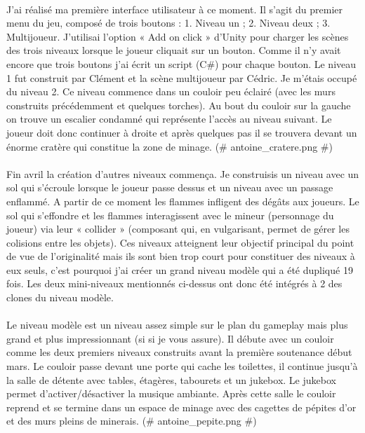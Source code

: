 \documentclass[titlepage, 13px, a4paper]{report}
\begin{document}
\paragraph{} \hspace{0pt} 
J'ai réalisé ma première interface utilisateur à ce moment. Il s'agit du premier menu
du jeu, composé de trois boutons : 1. Niveau un ; 2. Niveau deux ; 3. Multijoueur.
J'utilisai l'option « Add on click » d'Unity pour charger les scènes des trois niveaux
lorsque le joueur cliquait sur un bouton. Comme il n'y avait encore que trois
boutons j'ai écrit un script (C\#) pour chaque bouton. Le niveau 1 fut construit par
Clément et la scène multijoueur par Cédric. Je m'étais occupé du niveau 2. Ce
niveau commence dans un couloir peu éclairé (avec les murs construits
précédemment et quelques torches). Au bout du couloir sur la gauche on trouve un
escalier condamné qui représente l'accès au niveau suivant. Le joueur doit donc
continuer à droite et après quelques pas il se trouvera devant un énorme cratère
qui constitue la zone de minage. \@(\# antoine\_cratere.png \#)\@   \\


\paragraph{} \hspace{0pt} 
Fin avril la création d'autres niveaux commença. Je construisis un niveau avec un
sol qui s'écroule lorsque le joueur passe dessus et un niveau avec un passage
enflammé. A partir de ce moment les flammes infligent des dégâts aux joueurs. Le
sol qui s'effondre et les flammes interagissent avec le mineur (personnage du
joueur) via leur « collider » (composant qui, en vulgarisant, permet de gérer les
colisions entre les objets). Ces niveaux atteignent leur objectif principal du point de vue de
l'originalité mais ils sont bien trop court pour constituer des niveaux à eux seuls,
c'est pourquoi j'ai créer un grand niveau modèle qui a été dupliqué 19 fois. Les
deux mini-niveaux mentionnés ci-dessus ont donc été intégrés à 2 des clones du
niveau modèle. \\


\paragraph{} \hspace{0pt}
Le niveau modèle est un niveau assez simple sur le plan du gameplay mais plus
grand et plus impressionnant (si si je vous assure). Il débute avec un couloir
comme les deux premiers niveaux construits avant la première soutenance début
mars. Le couloir passe devant une porte qui cache les toilettes, il continue jusqu'à
la salle de détente avec tables, étagères, tabourets et un jukebox. Le jukebox
permet d'activer/désactiver la musique ambiante. Après cette salle le couloir
reprend et se termine dans un espace de minage avec des cagettes de pépites
d'or et des murs pleins de minerais. \@(\# antoine\_pepite.png \#)\@   \\
\end{document}
